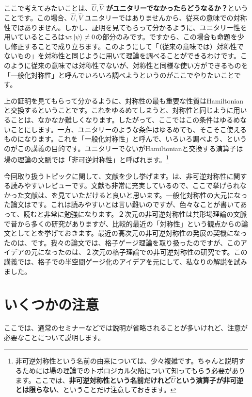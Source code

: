 \documentclass[report,paper=a4, fontsize=12pt, line_length=16cm, number_of_lines=33,dvipdfmx]{jlreq}
\newcommand{\kyou}[1]{{\sffamily \bfseries #1}}
\numberwithin{equation}{chapter}
\newcommand{\Uh}{\widehat{U}}
\newcommand{\Vh}{\widehat{V}}
\begin{document}
ここで考えてみたいことは、\kyou{$\Uh,\Vh$ がユニタリーでなかったらどうなるか？}ということです。この場合、$\Uh,\Vh$ ユニタリーではありませんから、従来の意味での対称性ではありません。しかし、証明を見てもらって分かるように、ユニタリー性を用いているところは$uv\ket{\psi}\ne 0$の部分のみです。ですから、この場合も命題を少し修正することで成り立ちます。このようにして「（従来の意味では）対称性でないもの」を対称性と同じように用いて理論を調べることができるわけです。このように従来の意味では対称性でないが、対称性と同様な使い方ができるものを「一般化対称性」と呼んでいろいろ調べようというのがここでやりたいことです。

上の証明を見てもらって分かるように、対称性の最も重要な性質はHamiltonianと交換するということです。これをゆるめてしまうと、対称性と同じように用いることは、なかなか難しくなります。したがって、ここではこの条件はゆるめないことにします。一方、ユニタリーのような条件はゆるめても、そこそこ使えるものになります。これを「一般化対称性」と呼んで、いろいろ調べよう、というのがこの講義の目的です。ユニタリーでないがHamiltonianと交換する演算子は場の理論の文脈では「非可逆対称性」と呼ばれます。\footnote{非可逆対称性という名前の由来については、少々複雑です。ちゃんと説明するためには場の理論でのトポロジカル欠陥について知ってもらう必要があります。ここでは、\kyou{非可逆対称性という名前だけれど$\Uh$という演算子が非可逆とは限らない}、ということだけ注意しておきます。}

今回取り扱うトピックに関して、文献を少し挙げます。\cite{Shao:2023gho}は、非可逆対称性に関する読みやすいレビューです。文献も非常に充実しているので、ここで挙げられなかった文献は、\cite{Shao:2023gho}を見ていただけると良いと思います。一般化対称性の大元になった論文は\cite{Gaiotto:2014kfa}です。これは読みやすいとは言い難いのですが、色々なことが書いてあって、読むと非常に勉強になります。２次元の非可逆対称性は共形場理論の文脈で昔から多くの研究がありますが、比較的最近の「対称性」という観点からの論文として\cite{Bhardwaj:2017xup}と\cite{Chang:2018iay}を挙げておきます。最近の高次元の非可逆対称性の発展の契機になったのは、\cite{Koide:2021zxj,Choi:2021kmx,Kaidi:2021xfk}です。我々の論文\cite{Koide:2021zxj}では、格子ゲージ理論を取り扱ったのですが、このアイデアの元になったのは、２次元の格子理論での非可逆対称性の研究\cite{Aasen:2016dop,Aasen:2020jwb}です。この講義では、格子での半空間ゲージ化\cite{Choi:2021kmx}のアイデアを元にして、私なりの解説を試みました。

\section{いくつかの注意}\label{sec:remarks}
ここでは、通常のセミナーなどでは説明が省略されることが多いけれど、注意が必要なことについて説明します。
\end{document}
